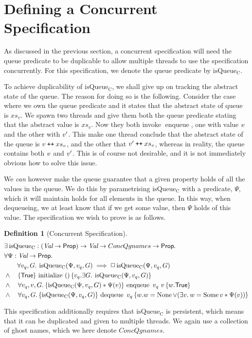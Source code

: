 \documentclass[a4paper, 10pt]{report}
\theoremstyle{definition}
\newtheorem{definition}{Definition}[section]
\newcommand{\initialise}{\operatorname{initialize}}
\newcommand{\enqueue}{\operatorname{enqueue}}
\newcommand{\dequeue}{\operatorname{dequeue}}
\newcommand{\isqueueconc}{\operatorname{isQueue_{C}}}
\newcommand{\ConcQgnames}{ConcQgnames}
\newcommand{\vq}{v_q}
\newcommand{\nodeval}{\valB}
\newcommand{\absvalue}{\val}
\newcommand{\absvalueList}{xs_v}
\newcommand{\Qg}{G}
\newcommand\catenate{\mathbin{\text{\ttfamily\upshape ++}}}
\newcommand{\concspecinitHTGen}[3]{\hoare{\TRUE}{\initialise \ \TT}{#2 . \Exists #3. \isqueueconc(#1, #2, #3)}}
\newcommand{\concspecinitGen}[3]{\concspecinitHTGen{#1}{#2}{#3}}
\newcommand{\concspecinit}[1]{\concspecinitGen{#1}{\vq}{\Qg}}
\newcommand{\concspecenqHT}[4]{\hoare{\isqueueconc(#1, #2, #4) \star{} #1(#3)}{\enqueue \ #2 \ #3}{\valB . \TRUE}}
\newcommand{\concspecenqGen}[4]{\All #2, #3, #4. \concspecenqHT{#1}{#2}{#3}{#4}}
\newcommand{\concspecenq}[1]{\concspecenqGen{#1}{\vq}{\absvalue}{\Qg}}
\newcommand{\concspecdeqHT}[3]{\hoare{\isqueueconc(#1, #2, #3)}{\dequeue \ #2}{\nodeval . \nodeval = \None \lor{} (\Exists \absvalue . \nodeval = \Some \absvalue \star{} #1(\absvalue))}}
\newcommand{\concspecdeqGen}[3]{\All #2, #3. \concspecdeqHT{#1}{#2}{#3}}
\newcommand{\concspecdeq}[1]{\concspecdeqGen{#1}{\vq}{\Qg}}
\begin{document}
\section{Defining a Concurrent Specification}
\label{QueueSpecs:section:conc}

As discussed in the previous section, a concurrent specification will need the queue predicate to be duplicable to allow multiple threads to use the specification concurrently. For this specification, we denote the queue predicate by $\isqueueconc$.

To achieve duplicability of $\isqueueconc$, we shall give up on tracking the abstract state of the queue. The reason for doing so is the following. Consider the case where we own the queue predicate and it states that the abstract state of queue is $\absvalueList$. We spawn two threads and give them both the queue predicate stating that the abstract value is $\absvalueList$. Now they both invoke $\enqueue$, one with value $\absvalue$ and the other with $\absvalue'$. This make one thread conclude that the abstract state of the queue is $\absvalue \catenate \absvalueList$, and the other that $\absvalue' \catenate \absvalueList$, whereas in reality, the queue contains both $\absvalue$ and $\absvalue'$. This is of course not desirable, and it is not immediately obvious how to solve this issue.

We \textit{can} however make the queue guarantee that a given property holds of all the values in the queue. We do this by parametrising $\isqueueconc$ with a predicate, $\Psi$, which it will maintain holds for all elements in the queue. In this way, when dequeueing, we at least know that if we get some value, then $\Psi$ holds of this value. The specification we wish to prove is as follows.
\begin{definition}[Concurrent Specification]\label{QueueSpecs:spec:conc}
\begin{align*}
  &\Exists \isqueueconc : (\Val \to \Prop) \to \Val \to \ConcQgnames \to \Prop.\\
  &\All \Psi : \Val \to \Prop.\\
  &\quad\quad \All \vq, \Qg . \isqueueconc(\Psi, \vq, \Qg) \implies \persistently \isqueueconc(\Psi, \vq, \Qg)\\
  &\land{}\quad\concspecinit{\Psi}\\
  &\land{}\quad\concspecenq{\Psi}\\
  &\land{}\quad\concspecdeq{\Psi}
\end{align*}
\end{definition}
This specification additionally requires that $\isqueueconc$ is persistent, which means that it can be duplicated and given to multiple threads. We again use a collection of ghost names, which we here denote $\ConcQgnames$.
\end{document}
